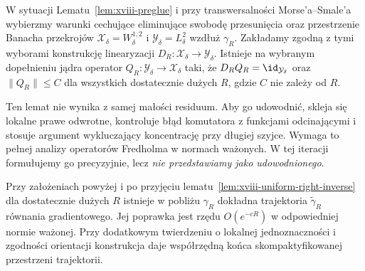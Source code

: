 \begin{lemat}
\label{lem:xviii-uniform-right-inverse}
W sytuacji Lematu~\ref{lem:xviii-preglue} i przy
transwersalności Morse'a--Smale'a wybierzmy
warunki cechujące eliminujące swobodę przesunięcia
oraz przestrzenie Banacha przekrojów
$\mathcal X_\delta=W^{1,2}_\delta$ i
$\mathcal Y_\delta=L^2_\delta$ wzdłuż $\gamma_R$.
Zakładamy zgodną z tymi wyborami konstrukcję
linearyzacji $D_R:\mathcal X_\delta\to\mathcal Y_\delta$.
Istnieje na wybranym dopełnieniu jądra operator
$Q_R:\mathcal Y_\delta\to\mathcal X_\delta$ taki, że
$D_RQ_R=\id_{\mathcal Y_\delta}$ oraz
$\|Q_R\|\le C$ dla wszystkich dostatecznie
dużych $R$, gdzie $C$ nie zależy od $R$.
\end{lemat}
\begin{uwaga}
Ten lemat nie wynika z samej małości residuum.
Aby go udowodnić, skleja się lokalne prawe odwrotne,
kontroluje błąd komutatora z funkcjami odcinającymi i
stosuje argument wykluczający koncentrację przy długiej szyjce.
Wymaga to pełnej analizy operatorów Fredholma w normach
ważonych. W tej iteracji formułujemy go precyzyjnie,
lecz \emph{nie przedstawiamy jako udowodnionego}.
\end{uwaga}
\begin{twierdzenie}
\label{thm:xviii-gluing-conditional}
Przy założeniach powyżej i po przyjęciu
lematu~\ref{lem:xviii-uniform-right-inverse} dla dostatecznie
dużych $R$ istnieje w pobliżu $\gamma_R$ dokładna
trajektoria $\widetilde\gamma_R$ równania gradientowego.
Jej poprawka jest rzędu $O(e^{-cR})$ w odpowiedniej normie
ważonej. Przy dodatkowym twierdzeniu o lokalnej jednoznaczności
i zgodności orientacji konstrukcja daje współrzędną końca
skompaktyfikowanej przestrzeni trajektorii.
\end{twierdzenie}
